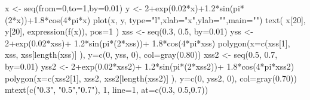 \begin{Schunk}
\begin{Sinput}
 x <- seq(from=0,to=1,by=0.01)
 y <- 2+exp(0.02*x)+1.2*sin(pi*(2*x))+1.8*cos(4*pi*x)
 plot(x, y, type="l",xlab="x",ylab="",main="")
 text( x[20], y[20], expression(f(x)), pos=1 )
 xss <- seq(0.3, 0.5, by=0.01)
 yss <- 2+exp(0.02*xss)+ 1.2*sin(pi*(2*xss))+ 1.8*cos(4*pi*xss)
 polygon(x=c(xss[1], xss, xss[length(xss)] ), y=c(0, yss, 0), col=gray(0.80))
 xss2 <- seq(0.5, 0.7, by=0.01)
 yss2 <- 2+exp(0.02*xss2)+ 1.2*sin(pi*(2*xss2))+ 1.8*cos(4*pi*xss2)
 polygon(x=c(xss2[1], xss2, xss2[length(xss2)] ), y=c(0, yss2, 0), col=gray(0.70))
 mtext(c("0.3", "0.5","0.7"), 1, line=1, at=c(0.3, 0.5,0.7))
\end{Sinput}
\end{Schunk}
